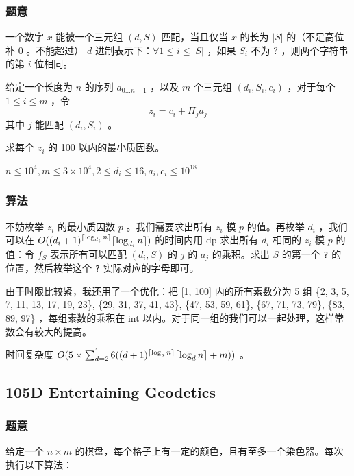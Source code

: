 \documentclass[11pt]{article}
\begin{document}
\subsubsection{题意}
\label{sec-5-3-1}

\begin{definition}
一个数字 $x$ 能被一个三元组 $(d, S)$ 匹配，当且仅当 $x$ 的长为 $|S|$ 的（不足高位补 0 。不能超过） $d$ 进制表示下：$\forall 1 \leq i \leq |S|$ ，如果 $S_i$ 不为 ? ，则两个字符串的第 $i$ 位相同。
\end{definition}

    给定一个长度为 $n$ 的序列 $a_{0 \dots n - 1}$ ，以及 $m$ 个三元组 $(d_i, S_i, c_i)$ ，对于每个 $1 \leq i \leq m$ ，令
    $$z_i = c_i + \Pi_{j} a_j$$
    其中 $j$ 能匹配 $(d_i, S_i)$ 。

    求每个 $z_i$ 的 100 以内的最小质因数。

    $n \leq 10^4, m \leq 3 \times 10^4, 2 \leq d_i \leq 16, a_i, c_i \leq 10^18$
\subsubsection{算法}
\label{sec-5-3-2}

    不妨枚举 $z_i$ 的最小质因数 $p$ 。我们需要求出所有 $z_i$ 模 $p$ 的值。再枚举 $d_i$ ，我们可以在 $O((d_i + 1)^{{\lceil \log_{d_i} n \rceil}} {\lceil \log_{d_i} n \rceil})$ 的时间内用 dp 求出所有 $d_i$ 相同的 $z_i$ 模 $p$ 的值：令 $f_{S}$ 表示所有可以匹配 $(d_i, S)$ 的 $j$ 的 $a_j$ 的乘积。求出 $S$ 的第一个 \texttt{?} 的位置，然后枚举这个 \texttt{?} 实际对应的字母即可。

    由于时限比较紧，我还用了一个优化：把 [1, 100] 内的所有素数分为 5 组 \{2, 3, 5, 7, 11, 13, 17, 19, 23\}, \{29, 31, 37, 41, 43\}, \{47, 53, 59, 61\},  \{67, 71, 73, 79\},  \{83, 89, 97\} ，每组素数的乘积在 int 以内。对于同一组的我们可以一起处理，这样常数会有较大的提高。

    时间复杂度 $O(5 \times \sum_{d = 2}^16 ((d + 1)^{{\lceil \log_d n \rceil}} {\lceil \log_d n \rceil} + m))$ 。
\subsection{105D  Entertaining Geodetics}
\label{sec-5-4}
\subsubsection{题意}
\label{sec-5-4-1}

    给定一个 $n \times m$ 的棋盘，每个格子上有一定的颜色，且有至多一个染色器。每次执行以下算法：
\end{document}

